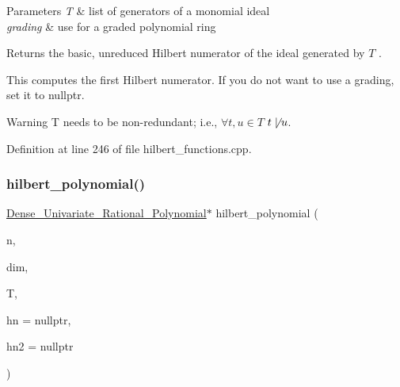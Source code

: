 \begin{DoxyParams}{Parameters}
{\em T} & list of generators of a monomial ideal \\
\hline
{\em grading} & use for a graded polynomial ring \\
\hline
\end{DoxyParams}
\begin{DoxyReturn}{Returns}
the basic, unreduced Hilbert numerator of the ideal generated by $ T $ .
\end{DoxyReturn}
This computes the first Hilbert numerator. If you do not want to use a grading, set it to {\ttfamily nullptr}. \begin{DoxyWarning}{Warning}
{\ttfamily T} needs to be non-\/redundant; i.\+e., $\forall t,u\in T$ $t\not\mid u$. 
\end{DoxyWarning}


Definition at line 246 of file hilbert\+\_\+functions.\+cpp.

\mbox{\label{group__commalg_ga717dcd7b189f83e0b60e2257d23c6bb9}} 
\subsubsection{\texorpdfstring{hilbert\+\_\+polynomial()}{hilbert\_polynomial()}}
{\footnotesize\ttfamily \hyperlink{group__polygroup_class_dense___univariate___rational___polynomial}{Dense\+\_\+\+Univariate\+\_\+\+Rational\+\_\+\+Polynomial}$\ast$ hilbert\+\_\+polynomial (\begin{DoxyParamCaption}\item[{N\+V\+A\+R\+\_\+\+T\+Y\+PE}]{n,  }\item[{unsigned int}]{dim,  }\item[{const list$<$ \hyperlink{group__polygroup_class_monomial}{Monomial} $>$}]{T,  }\item[{\hyperlink{group__polygroup_class_dense___univariate___integer___polynomial}{Dense\+\_\+\+Univariate\+\_\+\+Integer\+\_\+\+Polynomial} $\ast$}]{hn = {\ttfamily nullptr},  }\item[{\hyperlink{group__polygroup_class_dense___univariate___integer___polynomial}{Dense\+\_\+\+Univariate\+\_\+\+Integer\+\_\+\+Polynomial} $\ast$}]{hn2 = {\ttfamily nullptr} }\end{DoxyParamCaption})}



